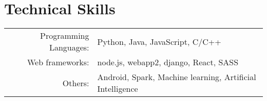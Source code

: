 \section{Technical Skills}
\renewcommand{\arraystretch}{1}%
\begin{tabular}{rl}

Programming Languages: &  Python, Java, JavaScript, C/C++ \\
Web frameworks: & node.js, webapp2, django, React, SASS\\
Others: & Android, Spark, Machine learning, Artificial Intelligence \\
\end{tabular}
\vspace{5pt}
